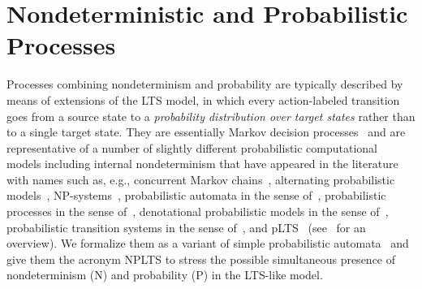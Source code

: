 \documentclass{LMCS}
\begin{document}
\section{Nondeterministic and Probabilistic Processes}
\label{sec:nplts}


Processes combining nondeterminism and probability are typically described by means of extensions of the LTS
model, in which every action-labeled transition goes from a source state to a \emph{probability distribution
over target states} rather than to a single target state. They are essentially Markov decision
processes~\cite{Der70} and are representative of a number of slightly different probabilistic computational
models including internal nondeterminism that have appeared in the literature with names such as, e.g.,
concurrent Markov chains~\cite{Var85}, alternating probabilistic models~\cite{HJ90,YL92,PLS00},
NP-systems~\cite{JHY94}, probabilistic automata in the sense of~\cite{Seg95a}, probabilistic processes in
the sense of~\cite{JY95}, denotational probabilistic models in the sense of~\cite{JSM97}, probabilistic
transition systems in the sense of~\cite{JY02}, and pLTS~\cite{DGHM08} (see~\cite{SD04} for an overview). We
formalize them as a variant of simple probabilistic automata~\cite{Seg95a} and give them the acronym NPLTS to
stress the possible simultaneous presence of nondeterminism (N) and probability (P) in the LTS-like model.
\end{document}
